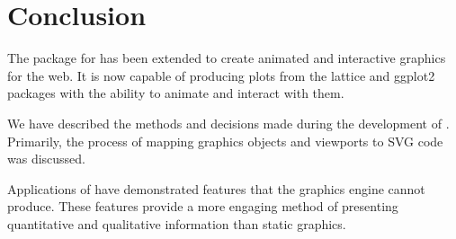 \chapter{Conclusion}

The \gridSVG{} package for \R{} has been extended to create animated and interactive graphics for the web.
It is now capable of producing plots from the \textsf{lattice} and \textsf{ggplot2} packages with the ability to animate and interact with them.

We have described the methods and decisions made during the development of \gridSVG{}.
Primarily, the process of mapping \grid{} graphics objects and viewports to SVG code was discussed.

Applications of \gridSVG{} have demonstrated features that the \R{} graphics engine cannot produce.
These features provide a more engaging method of presenting quantitative and qualitative information than static graphics.
